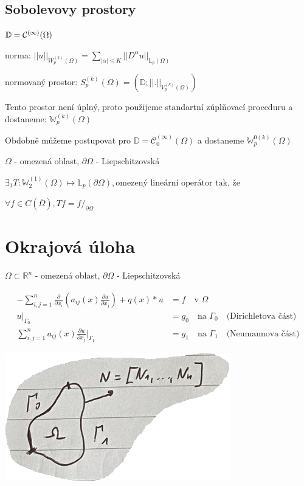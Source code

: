 \documentclass[../main.tex]{subfiles}
\begin{document}
\subsection{Sobolevovy prostory }

$\mathbb{D} = \mathcal{C}^{(\infty)}(\Omega)$

norma:
$||u||_{W_p^{(k)}(\Omega)} = \sum_{|\alpha| \leq K} ||D^\alpha u||_{\mathbb{L}_p(\Omega)}$

normovaný prostor: $S^{(k)}_p(\Omega) = (\mathbb{D}; ||.||_{V_p^{(k)}(\Omega)})$

Tento prostor není úplný, proto použijeme standartní zúplňovací proceduru a dostaneme:
$\mathbb{W}_p^{(k)}(\Omega)$

Obdobně můžeme postupovat pro $\mathbb{D} = \mathcal{C}^{(\infty)}_0(\Omega)$ a dostaneme $\mathbb{W}_p^{0 (k)}(\Omega)$

\begin{theorem}
    $\Omega$ - omezená oblast, $\partial \Omega$ - Liepschitzovská
    
    $\exists_1 T: \mathbb{W}_2^{(1)}(\Omega) \mapsto \mathbb{L}_p (\partial \Omega), \text{omezený lineární operátor tak, že}$
    
    $ \forall f\in C (\bar \Omega), Tf = f /_{\partial \Omega} $
\end{theorem}



\section{Okrajová úloha}\label{OkrajUloha}
$\Omega\subset\mathbb{R}^n$ - omezená oblast, $\partial \Omega$ - Liepschitzovská

\begin{align}\label{eq:okraj}
    - \sum_{i,j = 1}^{n} \frac{\partial}{\partial x_i} \left ( a_{ij}(x) \frac{\partial u}{\partial x_j}\right ) + q(x)*u &= f \quad \text{v } \Omega
    \\ \label{eq:PP1}
    u|_{\Gamma_0} &= g_0 \quad \text{na } \Gamma_0 \quad \text{(Dirichletova část)}
    \\ \label{eq:PP2}
    \sum_{i,j=1}^{n}a_{ij} (x) \frac{\partial u}{\partial x_j} |_{\Gamma_1} &= g_1 \quad \text{na } \Gamma_1 \quad \text{(Neumannova část)}
\end{align}

\includegraphics{images/oblast.PNG}
\end{document}

